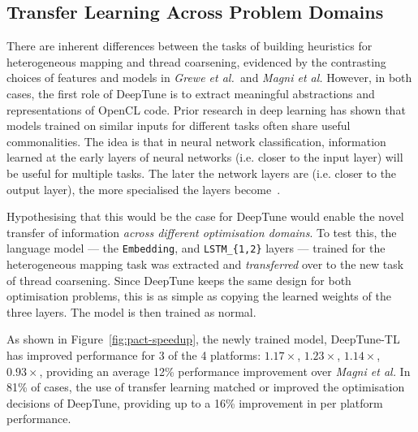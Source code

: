 \subsection{Transfer Learning Across Problem Domains}
\label{subsec:deeptune-transfer-learning}

There are inherent differences between the tasks of building heuristics for heterogeneous mapping and thread coarsening, evidenced by the contrasting choices of features and models in \emph{Grewe et al.\ }and \emph{Magni et al.} However, in both cases, the first role of DeepTune is to extract meaningful abstractions and representations of OpenCL code. Prior research in deep learning has shown that models trained on similar inputs for different tasks often share useful commonalities. The idea is that in neural network classification, information learned at the early layers of neural networks (i.e. closer to the input layer) will be useful for multiple tasks. The later the network layers are (i.e. closer to the output layer), the more specialised the layers become~\cite{Zeiler2014}.

Hypothesising that this would be the case for DeepTune would enable the novel transfer of information \emph{across different optimisation domains}. To test this, the language model --- the \texttt{Embedding}, and \texttt{LSTM\_\{1,2\}} layers --- trained for the heterogeneous mapping task was extracted and \emph{transferred} over to the new task of thread coarsening. Since DeepTune keeps the same design for both optimisation problems, this is as simple as copying the learned weights of the three layers. The model is then trained as normal.

As shown in Figure~\ref{fig:pact-speedup}, the newly trained model, DeepTune-TL has improved performance for 3 of the 4 platforms: $1.17\times$, $1.23\times$, $1.14\times$, $0.93\times$, providing an average 12\% performance improvement over \emph{Magni et al.}  In 81\% of cases, the use of transfer learning matched or improved the optimisation decisions of DeepTune, providing up to a 16\% improvement in per platform performance.

